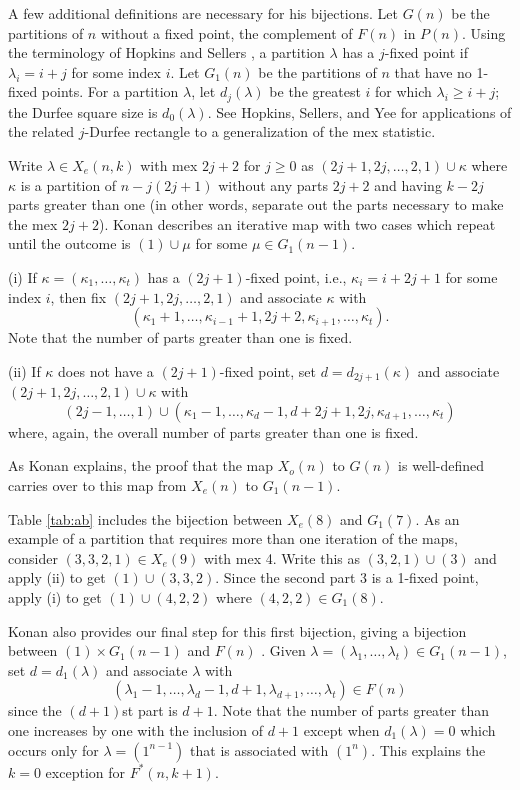 \documentclass{amsart}
\theoremstyle{theorem}
\theoremstyle{definition}
\begin{document}
A few additional definitions are necessary for his bijections.  Let $G(n)$ be the partitions of $n$ without a fixed point, the complement of $F(n)$ in $P(n)$.  Using the terminology of Hopkins and Sellers \cite{hs24}, a partition $\lambda$ has a $j$-fixed point if $\lambda_i = i+j$ for some index $i$.  Let $G_1(n)$ be the partitions of $n$ that have no 1-fixed points.
For a partition $\lambda$, let $d_j(\lambda)$ be the greatest $i$ for which $\lambda_i \ge i+j$; the Durfee square size is $d_0(\lambda)$.  See Hopkins, Sellers, and Yee \cite{hsy} for applications of the related $j$-Durfee rectangle to a generalization of the mex statistic.

Write $\lambda \in X_e(n,k)$ with mex $2j+2$ for $j \ge 0$ as $(2j+1, 2j, \ldots, 2, 1) \cup \kappa$ where $\kappa$ is a partition of $n - j(2j+1)$ without any parts $2j+2$ and having $k - 2j$ parts greater than one (in other words, separate out the parts necessary to make the mex $2j+2$).  Konan describes an iterative map with two cases which repeat until the outcome is $(1) \cup \mu$ for some $\mu \in G_1(n-1)$.

(i) If $\kappa = (\kappa_1, \ldots, \kappa_t)$ has a $(2j+1)$-fixed point, i.e., 
$\kappa_i = i+2j+1$ for some index $i$, then fix $(2j+1, 2j, \ldots, 2, 1)$ and associate $\kappa$ with
\[ (\kappa_1 +1, \ldots, \kappa_{i-1}+1, 2j+2, \kappa_{i+1}, \ldots, \kappa_t). \]
Note that the number of parts greater than one is fixed.

(ii) If $\kappa$ does not have a $(2j+1)$-fixed point, set $d = d_{2j+1}(\kappa)$ and associate $(2j+1, 2j, \ldots, 2, 1) \cup \kappa$ with
\[ (2j-1, \ldots, 1) \cup (\kappa_1 -1, \ldots, \kappa_d - 1, d+2j+1, 2j, \kappa_{d+1}, \ldots, \kappa_t) \]
where, again, the overall number of parts greater than one is fixed.

As Konan explains, the proof that the map $X_o(n)$ to $G(n)$ is well-defined \cite[\S 4]{k} carries over to this map from $X_e(n)$ to $G_1(n-1)$.  

Table \ref{tab:ab} includes the bijection between $X_e(8)$ and $G_1(7)$.  As an example of a partition that requires more than one iteration of the maps, consider $(3,3,2,1) \in X_e(9)$ with mex 4.  Write this as $(3,2,1) \cup (3)$ and apply (ii) to get $(1) \cup (3,3,2)$.  Since the second part 3 is a 1-fixed point, apply (i) to get $(1) \cup(4,2,2)$ where $(4,2,2) \in G_1(8)$.

Konan also provides our final step for this first bijection, giving a bijection between $(1) \times G_1(n-1)$ and $F(n)$ \cite[Lemma 18]{k}.  Given $\lambda = (\lambda_1, \ldots, \lambda_t) \in G_1(n-1)$, set $d = d_1(\lambda)$ and associate $\lambda$ with 
\[(\lambda_1 - 1, \ldots, \lambda_d - 1, d + 1, \lambda_{d+1}, \ldots, \lambda_t) \in F(n)\]
since the $(d+1)$st part is $d+1$.  Note that the number of parts greater than one increases by one with the inclusion of $d+1$ except when $d_1(\lambda) = 0$ which occurs only for $\lambda = (1^{n-1})$ that is associated with $(1^n)$.  This explains the $k = 0$ exception for $F^*(n,k+1)$.
\end{document}
